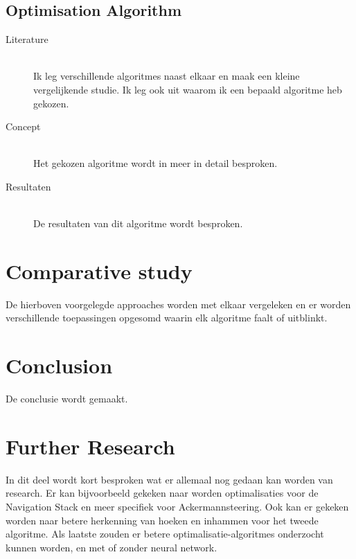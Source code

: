 \documentclass[conference,a4paper]{IEEEtran}
\begin{document}
\subsection{Optimisation Algorithm}
\begin{description}
\item[Literature] \hfill \\ Ik leg verschillende algoritmes naast elkaar en maak een kleine vergelijkende studie. Ik leg ook uit waarom ik een bepaald algoritme heb gekozen.

\item[Concept] \hfill \\ Het gekozen algoritme wordt in meer in detail besproken.

\item[Resultaten] \hfill \\ De resultaten van dit algoritme wordt besproken.

\end{description}

\section{Comparative study}
De hierboven voorgelegde approaches worden met elkaar vergeleken en er worden verschillende toepassingen opgesomd waarin elk algoritme faalt of uitblinkt.

\section{Conclusion}
De conclusie wordt gemaakt.

\section{Further Research}
In dit deel wordt kort besproken wat er allemaal nog gedaan kan worden van research. Er kan bijvoorbeeld gekeken naar worden optimalisaties voor de Navigation Stack en meer specifiek voor Ackermannsteering. Ook kan er gekeken worden naar betere herkenning van hoeken en inhammen voor het tweede algoritme. Als laatste zouden er betere optimalisatie-algoritmes onderzocht kunnen worden, en met of zonder neural network. 
\end{document}
